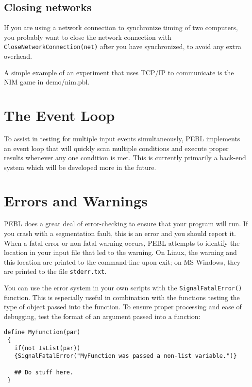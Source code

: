 \subsection{Closing networks}
If you are using a network connection to synchronize timing of two
computers, you probably want to close the network connection with
\texttt{CloseNetworkConnection(net)} after you have synchronized, to
avoid any extra overhead.

A simple example of an experiment that uses TCP/IP to communicate is
the NIM game in  demo/nim.pbl.

\section{The Event Loop}

To assist in testing for multiple input events simultaneously, 
PEBL implements an event loop that will quickly scan multiple conditions
and execute proper results whenever any one condition is met.  
This is currently primarily a back-end system 
which will be developed more in the future.


\section{Errors and Warnings}

PEBL does a great deal of error-checking to ensure that your program
will run.  If you crash with a segmentation fault, this is an error
and you should report it.  When a fatal error or non-fatal warning
occurs, PEBL attempts to identify the location in your input file that
led to the warning.  On Linux, the warning and this location are
printed to the command-line upon exit; on MS Windows, they are printed
to the file \texttt{stderr.txt}.

You can use the error system in your own scripts with the
\texttt{SignalFatalError()} function.  This is especially useful in
combination with the functions testing the type of object passed into 
the function.  To ensure proper processing and ease of debugging, test
the format of an argument passed into a function:

\begin{verbatim}
define MyFunction(par)
 {
   if(not IsList(par))
   {SignalFatalError("MyFunction was passed a non-list variable.")}

   ## Do stuff here.
 }
\end{verbatim}
 


